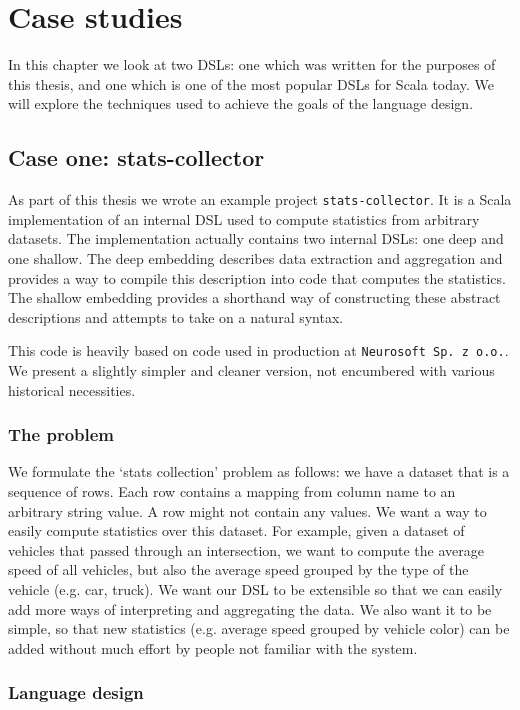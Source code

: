 \chapter{Case studies}

In this chapter we look at two DSLs: one which was written for the purposes of this thesis, and one which is one of the most popular DSLs for Scala today.
We will explore the techniques used to achieve the goals of the language design.

\section{Case one: stats-collector}

As part of this thesis we wrote an example project \texttt{stats-collector}.
It is a Scala implementation of an internal DSL used to compute statistics from arbitrary datasets.
The implementation actually contains two internal DSLs: one deep and one shallow.
The deep embedding describes data extraction and aggregation and provides a way to compile this description into code that computes the statistics.
The shallow embedding provides a shorthand way of constructing these abstract descriptions and attempts to take on a natural syntax.

This code is heavily based on code used in production at \texttt{Neurosoft~Sp.~z~o.o.}.
We present a slightly simpler and cleaner version, not encumbered with various historical necessities.

\subsection{The problem}

We formulate the `stats collection' problem as follows: we have a dataset that is a sequence of rows.
Each row contains a mapping from column name to an arbitrary string value.
A row might not contain any values.
We want a way to easily compute statistics over this dataset.
For example, given a dataset of vehicles that passed through an intersection, we want to compute the average speed of all vehicles, but also the average speed grouped by the type of the vehicle (e.g. car, truck).
We want our DSL to be extensible so that we can easily add more ways of interpreting and aggregating the data.
We also want it to be simple, so that new statistics (e.g. average speed grouped by vehicle color) can be added without much effort by people not familiar with the system.

\subsection{Language design}


